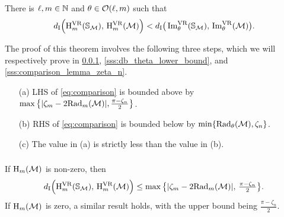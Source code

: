 \medskip\theorem
There is $\ell, m \in \mathbb{N}$ and $\theta \in \mathcal{O}(\ell, m)$ such that
\begin{equation}\label{eq:comparison}
    d_{\mathrm{I}} \Big(\mathrm{H}^{\mathrm{VR}}_{m}(\mathbb{S}_{\mathcal{M}}),\, \mathrm{H}^{\mathrm{VR}}_{m}(\mathcal{M})\Big) < d_{\mathrm{I}} \big(\operatorname{Im}^{\mathrm{VR}}_{\theta}(\mathbb{S}_{\mathcal{M}}),\, \operatorname{Im}^{\mathrm{VR}}_{\theta}(\mathcal{M})\big).
\end{equation}

The proof of this theorem involves the following three steps, which we will respectively prove in \cref{sss:db_upper_bound}, \cref{sss:db_theta_lower_bound}, and \cref{sss:comparison_lemma_zeta_n}.
\begin{enumerate}
    \item [(a)] LHS of \cref{eq:comparison} is bounded above by $\max\big\{|\zeta_m  - 2\mathrm{Rad}_{m}(\mathcal{M}) |, \tfrac{\pi - \zeta_n}{2}\big\}$.
    \item [(b)] RHS of \cref{eq:comparison} is bounded below by $\min\{\mathrm{Rad}_{\theta}(\mathcal{M}), \zeta_n\}$.
    \item [(c)] The value in (a) is strictly less than the value in (b).
\end{enumerate}

\subsubsection{}\label{sss:db_upper_bound}

\medskip\lemma
If \( \operatorname{H}_m(\mathcal{M}) \) is non-zero, then
\begin{equation}\label{eq:db_usual_upper_bound}
    d_{\mathrm{I}}\Big(\mathrm{H}^{\mathrm{VR}}_{m}(\mathbb{S}_{\mathcal{M}}),\, \mathrm{H}^{\mathrm{VR}}_{m}(\mathcal{M})\Big)
	\leq \max\big\{|\zeta_m  - 2\mathrm{Rad}_{m}(\mathcal{M}) |,\, \tfrac{\pi - \zeta_n}{2}\big\}.
\end{equation}
If \( \operatorname{H}_m(\mathcal{M}) \) is zero, a similar result holds, with the upper bound being $\tfrac{\pi - \zeta_n}{2}$.

